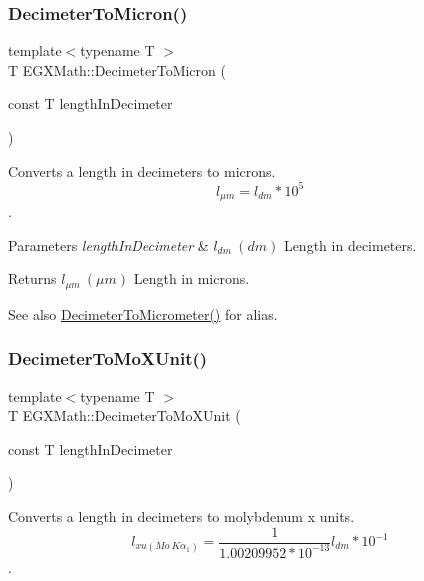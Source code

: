 \subsubsection{\texorpdfstring{Decimeter\+To\+Micron()}{DecimeterToMicron()}}
{\footnotesize\ttfamily template$<$typename T $>$ \\
T E\+G\+X\+Math\+::\+Decimeter\+To\+Micron (\begin{DoxyParamCaption}\item[{const T}]{length\+In\+Decimeter }\end{DoxyParamCaption})}



Converts a length in decimeters to microns. \[ l_{\mu m}=l_{dm} * 10^{5} \]. 


\begin{DoxyParams}{Parameters}
{\em length\+In\+Decimeter} & $ l_{dm}\ (dm)$ Length in decimeters. \\
\hline
\end{DoxyParams}
\begin{DoxyReturn}{Returns}
$ l_{\mu m}\ (\mu m)$ Length in microns. 
\end{DoxyReturn}
\begin{DoxySeeAlso}{See also}
\mbox{\hyperlink{group___e_g_x_math-_conversions-_length_conversions-_decimeter-_s_i_ga5cf28083fa005b5a6a0dd6817c1633b7}{Decimeter\+To\+Micrometer()}} for alias. 
\end{DoxySeeAlso}
\mbox{\label{group___e_g_x_math-_conversions-_length_conversions-_decimeter-_non-_s_i_ga609f53e09c9a767639da3ad72905bb71}} 
\subsubsection{\texorpdfstring{Decimeter\+To\+Mo\+X\+Unit()}{DecimeterToMoXUnit()}}
{\footnotesize\ttfamily template$<$typename T $>$ \\
T E\+G\+X\+Math\+::\+Decimeter\+To\+Mo\+X\+Unit (\begin{DoxyParamCaption}\item[{const T}]{length\+In\+Decimeter }\end{DoxyParamCaption})}



Converts a length in decimeters to molybdenum x units. \[ l_{xu(Mo\ K\alpha_1)}=\frac{1}{1.00209952*10^{-13}} l_{dm} * 10^{-1}\]. 


